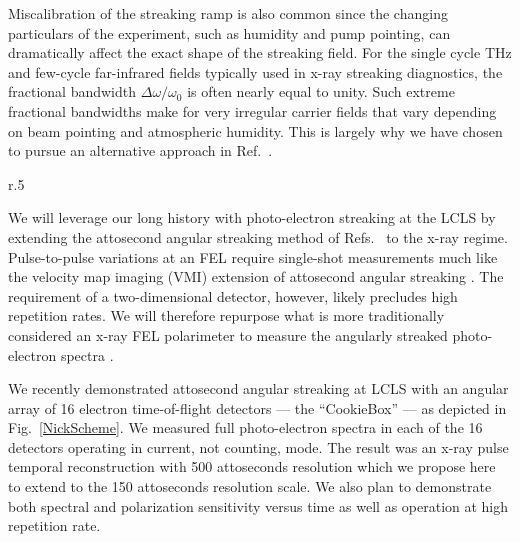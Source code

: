 Miscalibration of the streaking ramp is also common since the changing particulars of the experiment, such as humidity and pump pointing, can dramatically affect the exact shape of the streaking field.
For the single cycle THz and few-cycle far-infrared fields typically used in x-ray streaking diagnostics, the fractional bandwidth $\Delta\omega/\omega_0$ is often nearly equal to unity.
Such extreme fractional bandwidths make for very irregular carrier fields that vary depending on beam pointing and atmospheric humidity.
This is largely why we have chosen to pursue an alternative approach in Ref.~\cite{Nick2016}.

\begin{wrapfigure}[15]{r}{.5\linewidth}
\vspace{-.5\baselineskip}
\caption{\label{NickScheme}
Angular streaking schematic.
}
\end{wrapfigure}

We will leverage our long history with photo-electron streaking at the LCLS \cite{Duesterer11,Meyer12,Helml2014} by extending the attosecond angular streaking method of Refs.~\cite{CorkumAngularStreaking,KellerAngularStreaking} to the x-ray regime.
Pulse-to-pulse variations at an FEL require single-shot measurements much like the velocity map imaging (VMI) \cite{VrakkingRSI} extension of attosecond angular streaking \cite{attoclockVMI2013}.
The requirement of a two-dimensional detector, however, likely precludes high repetition rates. 
We will therefore repurpose what is more traditionally considered an x-ray FEL polarimeter \cite{Markus2014,Allaria2014,Mazza2014,Lutman2016} to measure the angularly streaked photo-electron spectra \cite{Markus2014,Allaria2014,Mazza2014,Lutman2016}.

We recently demonstrated attosecond angular streaking at LCLS with an angular array of 16 electron time-of-flight detectors --- the ``CookieBox'' --- as depicted in Fig.~\ref{NickScheme}.
We measured full photo-electron spectra in each of the 16 detectors operating in current, not counting, mode.
The result was an x-ray pulse temporal reconstruction with 500 attoseconds resolution \cite{Nick2016} which we propose here to extend to the 150 attoseconds resolution scale.
We also plan to demonstrate both spectral and polarization sensitivity versus time as well as operation at high repetition rate.

